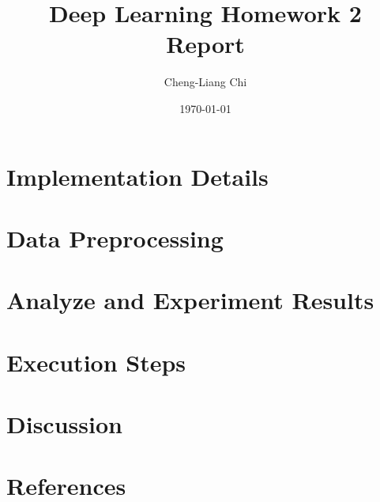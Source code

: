 \documentclass[12pt,a4paper]{article}
\title{Deep Learning Homework 2 Report}
\author{Cheng-Liang Chi}
\date{\today}
\begin{document}
\maketitle
\tableofcontents
\newpage

\section{Implementation Details}


\section{Data Preprocessing}


\section{Analyze and Experiment Results}


\section{Execution Steps}


\section{Discussion}


\section{References}
\printbibliography
\end{document}
